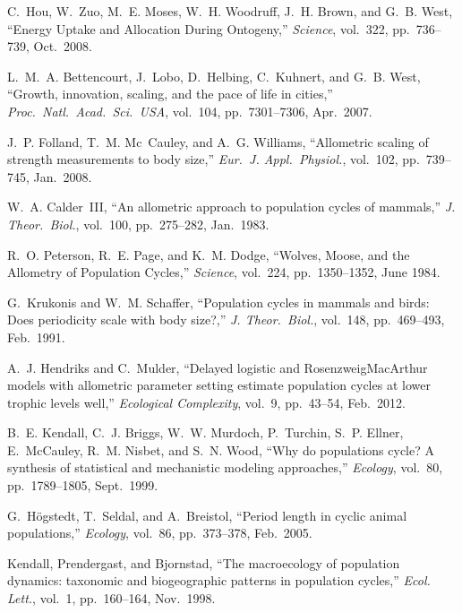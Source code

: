 \documentclass[twocolumn,preprintnumbers,amsmath,amssymb,superscriptaddress]{revtex4}
\begin{document}
{\begin{thebibliography}{10}
 C.~Hou, W.~Zuo, M.~E. Moses, W.~H. Woodruff, J.~H. Brown, and
  G.~B. West, ``{Energy Uptake and Allocation During Ontogeny},'' {\em
    Science}, vol.~322, pp.~736--739, Oct.\ 2008.

 L.~M.~A. Bettencourt, J.~Lobo, D.~Helbing, C.~Kuhnert,
  and G.~B. West, ``{Growth, innovation, scaling, and the pace of life in
    cities},'' {\em Proc.\ Natl.\ Acad.\ Sci.\ USA}, vol.~104,
  pp.~7301--7306, Apr.\ 2007.

 J.~P. Folland, T.~M. Mc~Cauley, and A.~G. Williams,
  ``{Allometric scaling of strength measurements to body size},'' {\em Eur.\
    J. Appl.\ Physiol.}, vol.~102, pp.~739--745, Jan.\ 2008.

 W.~A. Calder~III, ``{An allometric approach to
    population cycles of mammals},'' {\em J. Theor.\ Biol.}, vol.~100,
  pp.~275--282, Jan.\ 1983.

R.~O. Peterson, R.~E. Page, and K.~M. Dodge, ``{Wolves, Moose, and the
  Allometry of Population Cycles},'' {\em Science}, vol.~224, pp.~1350--1352,
  June 1984.

 G.~Krukonis and W.~M. Schaffer, ``{Population
    cycles in mammals and birds: Does periodicity scale with body size?},''
  {\em J. Theor.\ Biol.}, vol.~148, pp.~469--493, Feb.\ 1991.

A.~J. Hendriks and C.~Mulder, ``{Delayed logistic and
  Rosenzweig{\textendash}MacArthur models with allometric parameter setting
  estimate population cycles at lower trophic levels well},'' {\em Ecological
  Complexity}, vol.~9, pp.~43--54, Feb.\ 2012.

 B.~E. Kendall, C.~J. Briggs, W.~W. Murdoch,
  P.~Turchin, S.~P. Ellner, E.~McCauley, R.~M. Nisbet, and S.~N. Wood, ``{Why
    do populations cycle? A synthesis of statistical and mechanistic modeling
    approaches},'' {\em Ecology}, vol.~80, pp.~1789--1805, Sept.\ 1999.

 G.~H{\"o}gstedt, T.~Seldal, and A.~Breistol,
  ``{Period length in cyclic animal populations},'' {\em Ecology}, vol.~86,
  pp.~373--378, Feb.\ 2005.

 Kendall, Prendergast, and Bjornstad, ``{The
    macroecology of population dynamics: taxonomic and biogeographic patterns
    in population cycles},'' {\em Ecol. Lett.}, vol.~1, pp.~160--164,
  Nov.\ 1998.


\end{thebibliography}}
\end{document}
